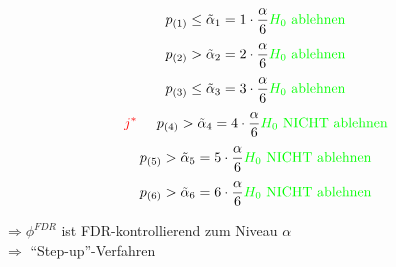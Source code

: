 \begin{exmp}
\[ p_{(1)} \leq \tilde{\alpha}_1  = 1 \cdot \frac{\alpha}{6} \textcolor{green}{H_0 \text{ ablehnen}} \]
\[ p_{(2)} > \tilde{\alpha}_2  = 2 \cdot \frac{\alpha}{6} \textcolor{green}{H_0 \text{ ablehnen}}\]
\[ p_{(3)} \leq \tilde{\alpha}_3  = 3 \cdot \frac{\alpha}{6} \textcolor{green}{H_0 \text{ ablehnen}}\]
\[\textcolor{red}{j^*}\hspace{0.5cm} p_{(4)} > \tilde{\alpha}_4  = 4 \cdot \frac{\alpha}{6} \textcolor{green}{H_0 \text{ NICHT ablehnen}}\]
\[ p_{(5)} > \tilde{\alpha}_5  = 5 \cdot \frac{\alpha}{6} \textcolor{green}{H_0 \text{ NICHT ablehnen}}\]
\[ p_{(6)} > \tilde{\alpha}_6  = 6 \cdot \frac{\alpha}{6} \textcolor{green}{H_0 \text{ NICHT ablehnen}}\]
\end{exmp}

$\Rightarrow \phi^{FDR}$ ist FDR-kontrollierend zum Niveau $\alpha$  \\
$\Rightarrow$ ``Step-up''-Verfahren

